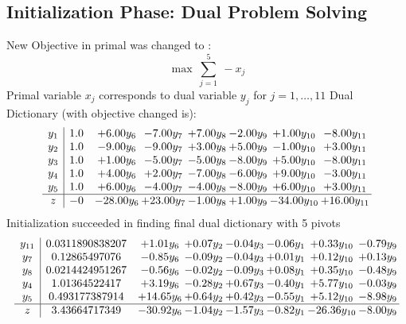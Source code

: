 \documentclass[8pt]{article}
\begin{document}
\subsection{Initialization Phase: Dual Problem Solving}
New Objective in primal was changed to : \[ \max\ \sum_{j=1}^{5}\ - x_j \] 
Primal variable $x_j$ corresponds to dual variable $y_j$ for $j = 1,\ldots,11$
Dual Dictionary (with objective changed is): 
\[\begin{array}{c| c c@{\hskip 2pt} c@{\hskip 2pt} c@{\hskip 2pt} c@{\hskip 2pt} c@{\hskip 2pt} c@{\hskip 2pt} }
 y_{1}   &  1.0 & +  6.00 y_{6} & -7.00 y_{7} & +  7.00 y_{8} & -2.00 y_{9} & +  1.00 y_{10} & -8.00 y_{11}\\
 y_{2}   &  1.0 & -9.00 y_{6} & -9.00 y_{7} & +  3.00 y_{8} & +  5.00 y_{9} & -1.00 y_{10} & +  3.00 y_{11}\\
 y_{3}   &  1.0 & +  1.00 y_{6} & -5.00 y_{7} & -5.00 y_{8} & -8.00 y_{9} & +  5.00 y_{10} & -8.00 y_{11}\\
 y_{4}   &  1.0 & +  4.00 y_{6} & +  2.00 y_{7} & -7.00 y_{8} & -6.00 y_{9} & +  9.00 y_{10} & -3.00 y_{11}\\
 y_{5}   &  1.0 & +  6.00 y_{6} & -4.00 y_{7} & -4.00 y_{8} & -8.00 y_{9} & +  6.00 y_{10} & +  3.00 y_{11}\\
\hline
z    &  -0 & -28.00 y_{6} & + 23.00 y_{7} & -1.00 y_{8} & +  1.00 y_{9} & -34.00 y_{10} & + 16.00 y_{11}\\
\end{array}\]
Initialization succeeded in finding final dual dictionary with 5 pivots
\[\begin{array}{c| c c@{\hskip 2pt} c@{\hskip 2pt} c@{\hskip 2pt} c@{\hskip 2pt} c@{\hskip 2pt} c@{\hskip 2pt} }
 y_{11}   &  0.0311890838207 & +  1.01 y_{6} & +  0.07 y_{2} & -0.04 y_{3} & -0.06 y_{1} & +  0.33 y_{10} & -0.79 y_{9}\\
 y_{7}   &  0.12865497076 & -0.85 y_{6} & -0.09 y_{2} & -0.04 y_{3} & +  0.01 y_{1} & +  0.12 y_{10} & +  0.13 y_{9}\\
 y_{8}   &  0.0214424951267 & -0.56 y_{6} & -0.02 y_{2} & -0.09 y_{3} & +  0.08 y_{1} & +  0.35 y_{10} & -0.48 y_{9}\\
 y_{4}   &  1.01364522417 & +  3.19 y_{6} & -0.28 y_{2} & +  0.67 y_{3} & -0.40 y_{1} & +  5.77 y_{10} & -0.03 y_{9}\\
 y_{5}   &  0.493177387914 & + 14.65 y_{6} & +  0.64 y_{2} & +  0.42 y_{3} & -0.55 y_{1} & +  5.12 y_{10} & -8.98 y_{9}\\
\hline
z    &  3.43664717349 & -30.92 y_{6} & -1.04 y_{2} & -1.57 y_{3} & -0.82 y_{1} & -26.36 y_{10} & -8.00 y_{9}\\
\end{array}\]
\end{document}
